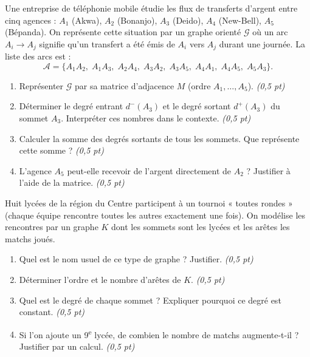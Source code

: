 \documentclass[11pt]{article}
\begin{document}
\begin{exercice}
Une entreprise de téléphonie mobile étudie les flux de transferts d'argent entre cinq agences : $A_1$ (Akwa), $A_2$ (Bonanjo), $A_3$ (Deido), $A_4$ (New-Bell), $A_5$ (Bépanda). On représente cette situation par un graphe orienté $\mathcal{G}$ où un arc $A_i \to A_j$ signifie qu'un transfert a été émis de $A_i$ vers $A_j$ durant une journée. La liste des arcs est :
\[
\mathcal{A} = \{A_1A_2,\; A_1A_3,\; A_2A_4,\; A_3A_2,\; A_3A_5,\; A_4A_1,\; A_4A_5,\; A_5A_3\}.
\]
\begin{enumerate}
    \item Représenter $\mathcal{G}$ par sa matrice d'adjacence $M$ (ordre $A_1, \dots, A_5$). \textit{(0,5 pt)}
    \item Déterminer le degré entrant $d^-(A_3)$ et le degré sortant $d^+(A_3)$ du sommet $A_3$. Interpréter ces nombres dans le contexte. \textit{(0,5 pt)}
    \item Calculer la somme des degrés sortants de tous les sommets. Que représente cette somme ? \textit{(0,5 pt)}
    \item L'agence $A_5$ peut-elle recevoir de l'argent directement de $A_2$ ? Justifier à l'aide de la matrice. \textit{(0,5 pt)}
\end{enumerate}
\end{exercice}

\begin{exercice}
Huit lycées de la région du Centre participent à un tournoi « toutes rondes » (chaque équipe rencontre toutes les autres exactement une fois). On modélise les rencontres par un graphe $K$ dont les sommets sont les lycées et les arêtes les matchs joués.
\begin{enumerate}
    \item Quel est le nom usuel de ce type de graphe ? Justifier. \textit{(0,5 pt)}
    \item Déterminer l'ordre et le nombre d'arêtes de $K$. \textit{(0,5 pt)}
    \item Quel est le degré de chaque sommet ? Expliquer pourquoi ce degré est constant. \textit{(0,5 pt)}
    \item Si l'on ajoute un 9\textsuperscript{e} lycée, de combien le nombre de matchs augmente-t-il ? Justifier par un calcul. \textit{(0,5 pt)}
\end{enumerate}
\end{exercice}
\end{document}
